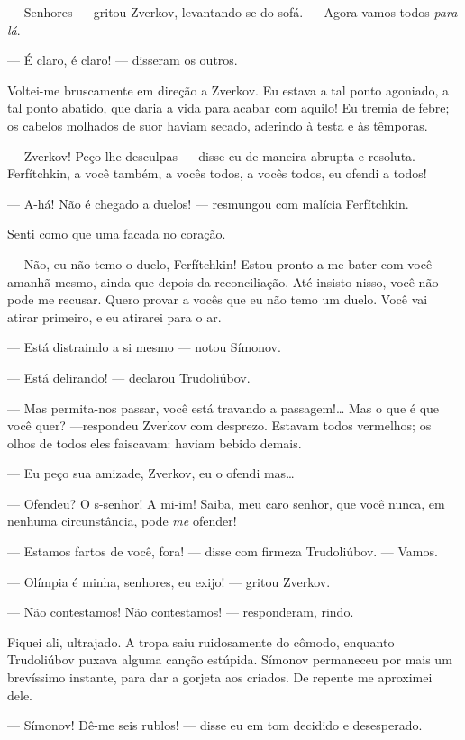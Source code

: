 --- Senhores --- gritou Zverkov, levantando-se do sofá. --- Agora vamos todos
\textit{para lá}.

--- É claro, é claro! --- disseram os outros.

Voltei-me bruscamente em direção a Zverkov. Eu estava a tal ponto
agoniado, a tal ponto abatido, que daria a vida para acabar com aquilo!
Eu tremia de febre; os cabelos molhados de suor haviam secado, aderindo
à testa e às têmporas.

--- Zverkov! Peço-lhe desculpas --- disse eu de maneira abrupta e resoluta.
--- Ferfítchkin, a você também, a vocês todos, a vocês todos, eu ofendi a
todos!

--- A-há! Não é chegado a duelos! --- resmungou com malícia Ferfítchkin.

Senti como que uma facada no coração.

--- Não, eu não temo o duelo, Ferfítchkin! Estou pronto a me bater com
você amanhã mesmo, ainda que depois da reconciliação. Até insisto
nisso, você não pode me recusar. Quero provar a vocês que eu não temo
um duelo. Você vai atirar primeiro, e eu atirarei para o ar.

--- Está distraindo a si mesmo --- notou Símonov.

--- Está delirando! --- declarou Trudoliúbov.

--- Mas permita-nos passar, você está travando a passagem!\ldots{} Mas o que é
que você quer? ---respondeu Zverkov com desprezo. Estavam todos
vermelhos; os olhos de todos eles faiscavam: haviam bebido demais.

--- Eu peço sua amizade, Zverkov, eu o ofendi mas\ldots{}

--- Ofendeu? O s-senhor! A mi-im! Saiba, meu caro senhor, que você nunca,
em nenhuma circunstância, pode \textit{me} ofender!

--- Estamos fartos de você, fora! --- disse com firmeza Trudoliúbov. ---
Vamos.

--- Olímpia é minha, senhores, eu exijo! --- gritou Zverkov.

--- Não contestamos! Não contestamos! --- responderam, rindo.

Fiquei ali, ultrajado. A tropa saiu ruidosamente do cômodo, enquanto
Trudoliúbov puxava alguma canção estúpida. Símonov permaneceu por mais
um brevíssimo instante, para dar a gorjeta aos criados. De repente me
aproximei dele.

--- Símonov! Dê-me seis rublos! --- disse eu em tom decidido e desesperado.

